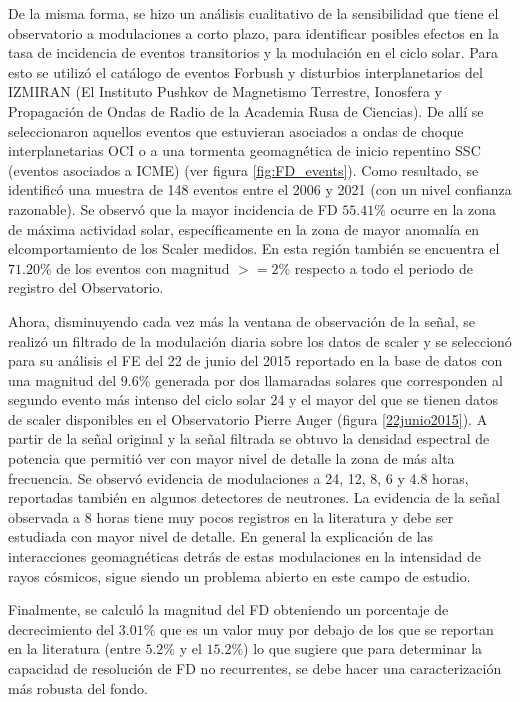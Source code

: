 De la misma forma, se hizo un análisis cualitativo de la sensibilidad que tiene el observatorio a modulaciones a corto plazo, para identificar posibles efectos en la tasa de incidencia de eventos transitorios y la modulación en el ciclo solar. Para esto se utilizó el catálogo de eventos Forbush y disturbios interplanetarios del IZMIRAN (El Instituto Pushkov de Magnetismo Terrestre, Ionosfera y Propagación de Ondas de Radio de la Academia Rusa de Ciencias). De allí se seleccionaron aquellos eventos que estuvieran asociados a ondas de choque interplanetarias OCI o a una tormenta geomagnética de inicio repentino SSC (eventos asociados a ICME) (ver figura \ref{fig:FD_events}). Como resultado, se identificó una muestra de 148 eventos entre el 2006 y 2021 (con un nivel confianza razonable). Se observó que la mayor incidencia de FD $55.41\%$  ocurre en la zona de máxima actividad solar, específicamente en la zona de mayor anomalía en elcomportamiento de los Scaler medidos. En esta región también se encuentra el $71.20\%$ de los eventos con magnitud $>= 2\%$ respecto a todo el periodo de registro del Observatorio.

Ahora, disminuyendo cada vez más la ventana de observación de la señal, se realizó un filtrado de la modulación diaria sobre los datos de scaler y se seleccionó para su análisis el FE del 22 de junio del 2015 reportado en la base de datos con una magnitud del $9.6\%$ generada por dos llamaradas solares que corresponden al segundo evento más intenso del ciclo solar 24 y el mayor del que se tienen datos de scaler disponibles en el Observatorio Pierre Auger (figura \ref{22junio2015}). A partir de la señal original y la señal filtrada se obtuvo la densidad espectral de potencia que permitió ver con mayor nivel de detalle la zona de más alta frecuencia. Se observó evidencia de modulaciones a 24, 12, 8, 6 y 4.8 horas, reportadas también en algunos detectores de neutrones. La evidencia de la señal observada a 8 horas tiene muy pocos registros en la literatura y debe ser estudiada con mayor nivel de detalle. En general la explicación de las interacciones geomagnéticas detrás de estas modulaciones en la intensidad de rayos cósmicos, sigue siendo un problema abierto en este campo de estudio. 

Finalmente, se calculó la magnitud del FD obteniendo un porcentaje de decrecimiento del $3.01\%$ que es un valor muy por debajo de los que se reportan en la literatura (entre $5.2\%$ y el $15.2\%$) lo que sugiere que para determinar la capacidad de resolución de FD no recurrentes, se debe hacer una caracterización más robusta del fondo.